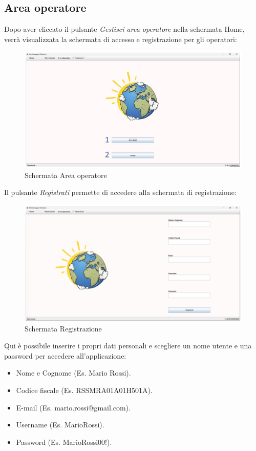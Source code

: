 \subsection{Area operatore}
Dopo aver cliccato il pulsante \emph{Gestisci area operatore} nella schermata Home, verrà visualizzata la schermata di accesso e registrazione per gli operatori:
\begin{figure}[H]
    \centering
    \includegraphics[width=1\textwidth]{../../img/schermata_area_operatore.png}
    \caption{Schermata Area operatore}
\end{figure}

Il pulsante \emph{Registrati} permette di accedere alla schermata di registrazione:
\begin{figure}[H]
    \centering
    \includegraphics[width=1\textwidth]{../../img/schermata_registrazione.png}
    \caption{Schermata Registrazione}
\end{figure}

Qui è possibile inserire i propri dati personali e scegliere un nome utente e una password per accedere all'applicazione:
\begin{itemize}
    \item Nome e Cognome (Es. Mario Rossi).
    \item Codice fiscale (Es. RSSMRA01A01H501A).
    \item E-mail (Es. mario.rossi@gmail.com).
    \item Username (Es. MarioRossi).
    \item Password (Es. MarioRossi00!).
\end{itemize}

